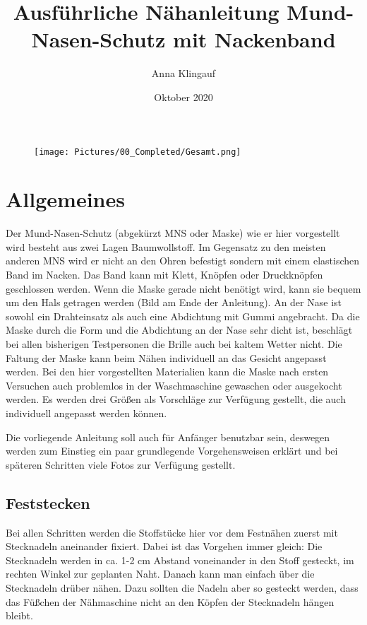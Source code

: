 \documentclass[12pt,parskip=full]{scrartcl}
\title{Ausführliche Nähanleitung Mund-Nasen-Schutz mit Nackenband}
\author{Anna Klingauf}
\date{Oktober 2020}
\begin{document}
\begin{titlepage}
\maketitle
\thispagestyle{empty}
\begin{figure}[b!] 
  \centering
     \texttt{[image: Pictures/00\_Completed/Gesamt.png]}
\end{figure}
\end{titlepage}
\clearpage

\section*{Allgemeines}
Der Mund-Nasen-Schutz (abgekürzt MNS oder Maske) wie er hier vorgestellt wird besteht aus zwei Lagen Baumwollstoff. Im Gegensatz zu den meisten anderen MNS wird er nicht an den Ohren befestigt sondern mit einem elastischen Band im Nacken. Das Band kann mit Klett, Knöpfen oder Druckknöpfen geschlossen werden. Wenn die Maske gerade nicht benötigt wird, kann sie bequem um den Hals getragen werden (Bild am Ende der Anleitung). An der Nase ist sowohl ein Drahteinsatz als auch eine Abdichtung mit Gummi angebracht. Da die Maske durch die Form und die Abdichtung an der Nase sehr dicht ist, beschlägt bei allen bisherigen Testpersonen die Brille auch bei kaltem Wetter nicht. Die Faltung der Maske kann beim Nähen individuell an das Gesicht angepasst werden. Bei den hier vorgestellten Materialien kann die Maske nach ersten Versuchen auch problemlos in der Waschmaschine gewaschen oder ausgekocht werden. Es werden drei Größen als Vorschläge zur Verfügung gestellt, die auch individuell angepasst werden können. \par

Die vorliegende Anleitung soll auch für Anfänger benutzbar sein, deswegen werden zum Einstieg ein paar grundlegende Vorgehensweisen erklärt und bei späteren Schritten viele Fotos zur Verfügung gestellt.

\subsection*{Feststecken}
Bei allen Schritten werden die Stoffstücke hier vor dem Festnähen zuerst mit Stecknadeln aneinander fixiert. Dabei ist das Vorgehen immer gleich: Die Stecknadeln werden in ca. 1-2 cm Abstand voneinander in den Stoff gesteckt, im rechten Winkel zur geplanten Naht. Danach kann man einfach über die Stecknadeln drüber nähen. Dazu sollten die Nadeln aber so gesteckt werden, dass das Füßchen der Nähmaschine nicht an den Köpfen der Stecknadeln hängen bleibt.
\end{document}
